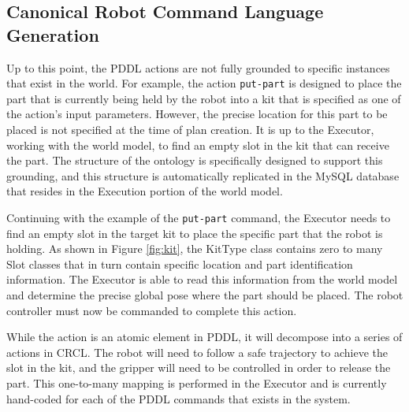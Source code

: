 \subsection{Canonical Robot Command Language Generation}
Up to this point, the PDDL actions are not fully grounded to specific instances
that exist in the world. For example, the action \texttt{put-part} is designed
to place the part that is currently being held by the robot into a kit that
is specified as one of the action's input parameters. However, the precise
location for this part to be placed is not specified at the time of plan
creation. It is up to the Executor, working with the world model, to find
an empty slot in the kit that can receive the part. The structure of the
ontology is specifically designed to support this grounding, and this
structure is automatically replicated in the MySQL database that resides
in the Execution portion of the world model. 

Continuing with
the example of the \texttt{put-part} command, the Executor needs to find
an empty slot in the target kit to place the specific part that the robot is
holding. As shown in Figure \ref{fig:kit}, the {\sc KitType} class contains
zero to many {\sc Slot} classes that in turn contain specific location and 
part identification information. The Executor is able to read this information
from the world model and determine the precise global pose where the part
should be placed. The robot controller must now be commanded to complete this action.

While the action is an atomic element in PDDL, it will decompose into a series
of actions in CRCL. The robot will need to follow a safe trajectory to achieve
the slot in the kit, and the gripper will need to be controlled in order to release
the part. This one-to-many mapping is performed in the Executor and is currently
hand-coded for each of the PDDL commands that exists in the system. 
%
